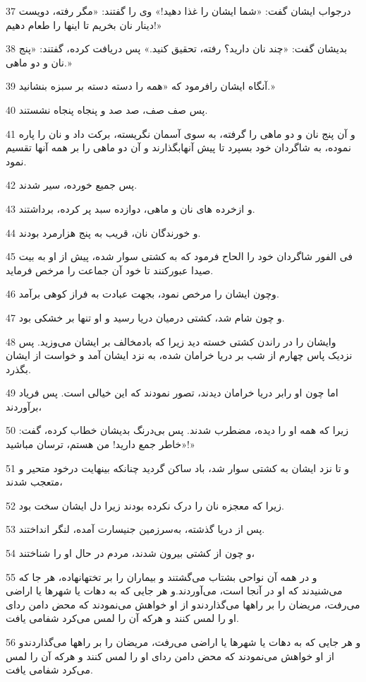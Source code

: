 \par 37 درجواب ایشان گفت: «شما ایشان را غذا دهید!» وی را گفتند: «مگر رفته، دویست دینار نان بخریم تا اینها را طعام دهیم!»
\par 38 بدیشان گفت: «چند نان دارید؟ رفته، تحقیق کنید.» پس دریافت کرده، گفتند: «پنج نان و دو ماهی.»
\par 39 آنگاه ایشان رافرمود که «همه را دسته دسته بر سبزه بنشانید.»
\par 40 پس صف صف، صد صد و پنجاه پنجاه نشستند.
\par 41 و آن پنج نان و دو ماهی را گرفته، به سوی آسمان نگریسته، برکت داد و نان را پاره نموده، به شاگردان خود بسپرد تا پیش آنهابگذارند و آن دو ماهی را بر همه آنها تقسیم نمود.
\par 42 پس جمیع خورده، سیر شدند.
\par 43 و ازخرده های نان و ماهی، دوازده سبد پر کرده، برداشتند.
\par 44 و خورندگان نان، قریب به پنج هزارمرد بودند.
\par 45 فی الفور شاگردان خود را الحاح فرمود که به کشتی سوار شده، پیش از او به بیت صیدا عبورکنند تا خود آن جماعت را مرخص فرماید.
\par 46 وچون ایشان را مرخص نمود، بجهت عبادت به فراز کوهی برآمد.
\par 47 و چون شام شد، کشتی درمیان دریا رسید و او تنها بر خشکی بود.
\par 48 وایشان را در راندن کشتی خسته دید زیرا که بادمخالف بر ایشان می‌وزید. پس نزدیک پاس چهارم از شب بر دریا خرامان شده، به نزد ایشان آمد و خواست از ایشان بگذرد.
\par 49 اما چون او رابر دریا خرامان دیدند، تصور نمودند که این خیالی است. پس فریاد برآوردند،
\par 50 زیرا که همه او را دیده، مضطرب شدند. پس بی‌درنگ بدیشان خطاب کرده، گفت: «خاطر جمع دارید! من هستم، ترسان مباشید!»
\par 51 و تا نزد ایشان به کشتی سوار شد، باد ساکن گردید چنانکه بینهایت درخود متحیر و متعجب شدند،
\par 52 زیرا که معجزه نان را درک نکرده بودند زیرا دل ایشان سخت بود.
\par 53 پس از دریا گذشته، به‌سرزمین جنیسارت آمده، لنگر انداختند.
\par 54 و چون از کشتی بیرون شدند، مردم در حال او را شناختند،
\par 55 و در همه آن نواحی بشتاب می‌گشتند و بیماران را بر تختهانهاده، هر جا که می‌شنیدند که او در آنجا است، می‌آوردند.و هر جایی که به دهات یا شهرها یا اراضی می‌رفت، مریضان را بر راهها می‌گذاردندو از او خواهش می‌نمودند که محض دامن ردای او را لمس کنند و هر‌که آن را لمس می‌کرد شفامی یافت.
\par 56 و هر جایی که به دهات یا شهرها یا اراضی می‌رفت، مریضان را بر راهها می‌گذاردندو از او خواهش می‌نمودند که محض دامن ردای او را لمس کنند و هر‌که آن را لمس می‌کرد شفامی یافت.

